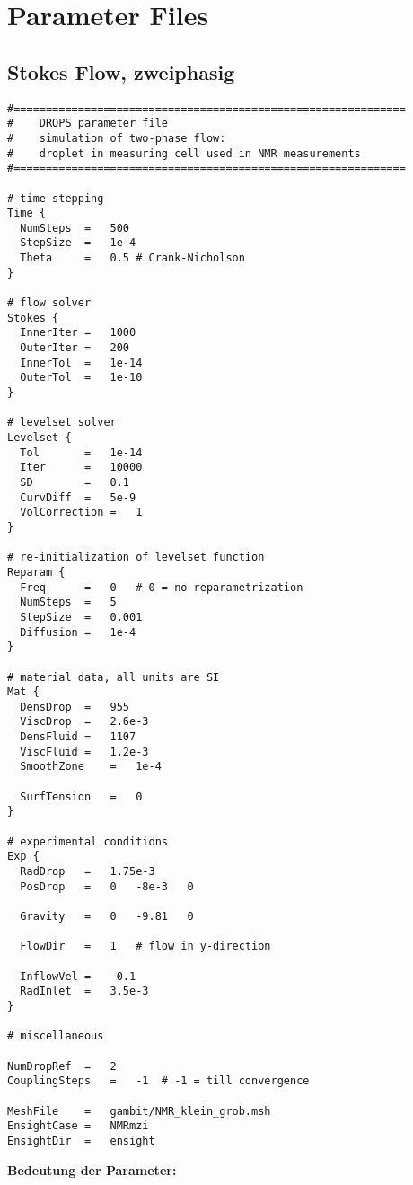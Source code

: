 \section{Parameter Files}
\label{s:ParamFiles}

\subsection{Stokes Flow, zweiphasig}
\begin{Code}
\begin{verbatim}
#=============================================================
#    DROPS parameter file
#    simulation of two-phase flow: 
#    droplet in measuring cell used in NMR measurements
#=============================================================

# time stepping
Time {
  NumSteps	=	500
  StepSize	=	1e-4
  Theta		=	0.5	# Crank-Nicholson
}

# flow solver
Stokes {
  InnerIter	=	1000
  OuterIter	=	200
  InnerTol	=	1e-14
  OuterTol	=	1e-10
}

# levelset solver
Levelset {
  Tol		=	1e-14
  Iter		=	10000
  SD		=	0.1
  CurvDiff	=	5e-9
  VolCorrection	=	1
}

# re-initialization of levelset function
Reparam { 
  Freq		=	0	# 0 = no reparametrization
  NumSteps	=	5
  StepSize	=	0.001
  Diffusion	=	1e-4
}

# material data, all units are SI
Mat {
  DensDrop	=	955
  ViscDrop	=	2.6e-3
  DensFluid	=	1107
  ViscFluid	=	1.2e-3
  SmoothZone	=	1e-4
  
  SurfTension	=	0
}

# experimental conditions
Exp {
  RadDrop	=	1.75e-3
  PosDrop	=	0	-8e-3	0
  
  Gravity	=	0	-9.81	0
  
  FlowDir	=	1	# flow in y-direction
  
  InflowVel	=	-0.1
  RadInlet	=	3.5e-3
}  

# miscellaneous

NumDropRef	=	2
CouplingSteps	=	-1	# -1 = till convergence

MeshFile	=	gambit/NMR_klein_grob.msh
EnsightCase	=	NMRmzi
EnsightDir	=	ensight
\end{verbatim}
\end{Code}

{\bf Bedeutung der Parameter: }\\

